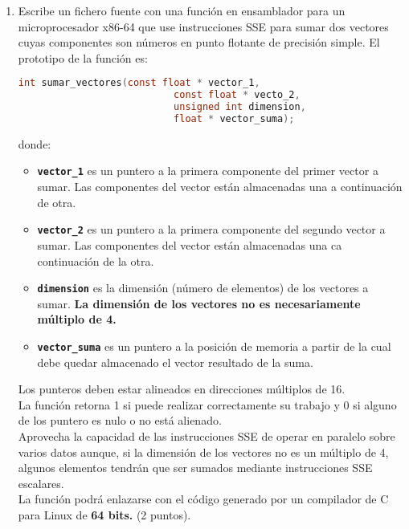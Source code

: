 \documentclass[12pt,letterpaper]{article}
\begin{document}
\begin{enumerate}
	\item Escribe un fichero fuente con una función en ensamblador para un microprocesador x86-64 que use instrucciones SSE para sumar dos vectores cuyas componentes son números en punto flotante de precisión simple. El prototipo de la función es:
	\begin{lstlisting}[language=C]
		int sumar_vectores(const float * vector_1,
		                   const float * vecto_2,
		                   unsigned int dimension,
		                   float * vector_suma);
	\end{lstlisting}
	donde:
	\begin{itemize}
		\item \textbf{\texttt{vector\_1}} es un puntero a la primera componente del primer vector a sumar. Las componentes del vector están almacenadas una a continuación de otra.
		\item \textbf{\texttt{vector\_2}} es un puntero a la primera componente del segundo vector a sumar. Las componentes del vector están almacenadas una ca continuación de la otra.
		\item \textbf{\texttt{dimension}} es la dimensión (número de elementos) de los vectores a sumar. \textbf{La dimensión de los vectores no es necesariamente múltiplo de 4.}
		\item \textbf{\texttt{vector\_suma}} es un puntero a la posición de memoria a partir de la cual debe quedar almacenado el vector resultado de la suma.
	\end{itemize}
	Los punteros deben estar alineados en direcciones múltiplos de 16.\\
	La función retorna 1 si puede realizar correctamente su trabajo y 0 si alguno de los puntero es nulo o no está alienado.\\
	Aprovecha la capacidad de las instrucciones SSE de operar en paralelo sobre varios datos aunque, si la dimensión de los vectores no es un múltiplo de 4, algunos elementos tendrán que ser sumados mediante instrucciones SSE escalares.\\
	La función podrá enlazarse con el código generado por un compilador de C para Linux de \textbf{64 bits.} (2 puntos).
\end{enumerate}
\end{document}
